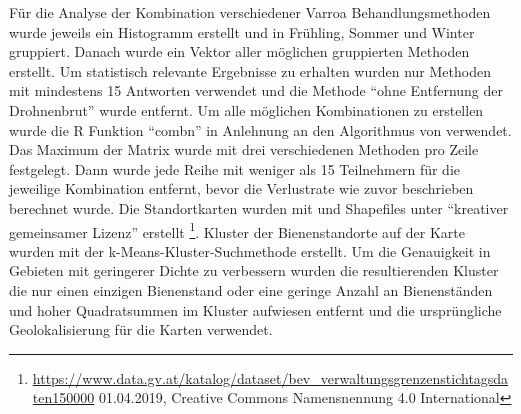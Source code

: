 \newline
Für die Analyse der Kombination verschiedener Varroa Behandlungsmethoden wurde jeweils ein Histogramm erstellt und in Frühling, Sommer und Winter gruppiert. Danach wurde ein Vektor aller möglichen gruppierten Methoden erstellt. Um statistisch relevante Ergebnisse zu erhalten wurden nur Methoden mit mindestens 15 Antworten verwendet und die Methode \enquote{ohne Entfernung der Drohnenbrut} wurde entfernt. Um alle möglichen Kombinationen zu erstellen wurde die R Funktion \enquote{combn} in Anlehnung an den Algorithmus von \cite{nijenhuis1978} verwendet. Das Maximum der Matrix wurde mit drei verschiedenen Methoden pro Zeile festgelegt. Dann wurde jede Reihe mit weniger als 15 Teilnehmern für die jeweilige Kombination entfernt, bevor die Verlustrate wie zuvor beschrieben berechnet wurde.
\newline
Die Standortkarten wurden mit \cite{rcoreteam2020} und Shapefiles unter \enquote{kreativer gemeinsamer Lizenz} erstellt \footnote{\url{https://www.data.gv.at/katalog/dataset/bev_verwaltungsgrenzenstichtagsdaten150000} 01.04.2019, Creative Commons Namensnennung 4.0 International }. Kluster der Bienenstandorte auf der Karte wurden mit der k-Means-Kluster-Suchmethode erstellt. Um die Genauigkeit in Gebieten mit geringerer Dichte zu verbessern wurden die resultierenden Kluster die nur einen einzigen Bienenstand oder eine geringe Anzahl an Bienenständen und hoher Quadratsummen im Kluster aufwiesen entfernt und die ursprüngliche Geolokalisierung für die Karten verwendet.
